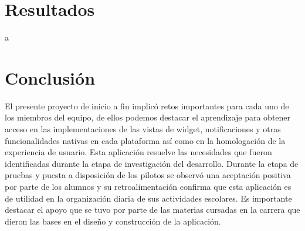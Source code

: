 \documentclass[10pt]{article}
\begin{document}


\section{Resultados}
\justify
a

\par\vspace{\baselineskip}
\newpage

\section{Conclusión}
\justify
El presente proyecto de inicio a fin implicó retos importantes para cada uno de los miembros del equipo, de ellos podemos destacar el aprendizaje para obtener acceso en las implementaciones de las vistas de widget, notificaciones y otras funcionalidades nativas en cada plataforma así como en la homologación de la experiencia de usuario. Esta aplicación resuelve las necesidades que fueron identificadas durante la etapa de investigación del desarrollo. Durante la etapa de pruebas y puesta a disposición de los pilotos se observó una aceptación positiva por parte de los alumnos y su retroalimentación confirma que esta aplicación es de utilidad en la organización diaria de sus actividades escolares. Es importante destacar el apoyo que se tuvo por parte de las materias cursadas en la carrera que dieron las bases en el diseño y construcción de la aplicación.

 
 
\end{document}
